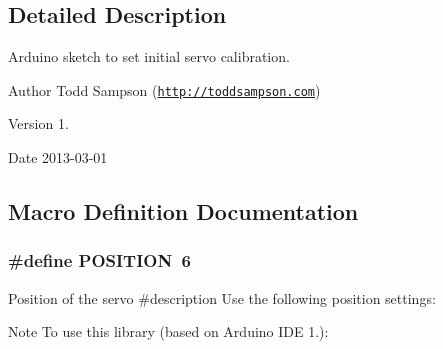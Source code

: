 \subsection{Detailed Description}
Arduino sketch to set initial servo calibration. \begin{DoxyAuthor}{Author}
Todd Sampson (\href{http://toddsampson.com}{\tt http\-://toddsampson.\-com}) 
\end{DoxyAuthor}
\begin{DoxyVersion}{Version}
1. 
\end{DoxyVersion}
\begin{DoxyDate}{Date}
2013-\/03-\/01 
\end{DoxyDate}


\subsection{Macro Definition Documentation}
\hypertarget{_servo_set_position_8ino_a440f0e10bb28b153f5661c934bc6b89f}{
\subsubsection[{P\-O\-S\-I\-T\-I\-O\-N}]{\setlength{\rightskip}{0pt plus 5cm}\#define P\-O\-S\-I\-T\-I\-O\-N~6}}\label{_servo_set_position_8ino_a440f0e10bb28b153f5661c934bc6b89f}


Position of the servo \#description Use the following position settings\-: 

\begin{DoxyNote}{Note}
To use this library (based on Arduino I\-D\-E 1.)\-:
\end{DoxyNote}

